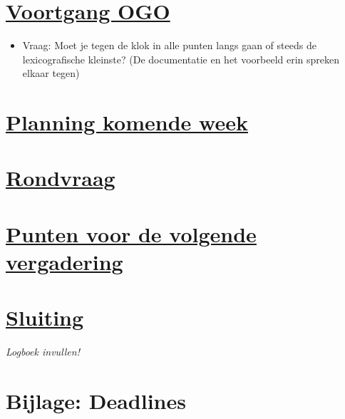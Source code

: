\documentclass[a4paper]{article}
\begin{document}

\section{\underline{Voortgang OGO}} %
\label{sec:voortgang_ogo}
    \begin{itemize}
        \item Vraag: Moet je tegen de klok in alle punten langs gaan of steeds de lexicografische kleinste? (De documentatie en het voorbeeld erin spreken elkaar tegen)
    \end{itemize}

\section{\underline{Planning komende week}} %
\label{sec:planning_komende_week}


\section{\underline{Rondvraag}} %
\label{sec:rondvraag}


\section{\underline{Punten voor de volgende vergadering}} %
\label{sec:punten_voor_de_volgende_vergadering}


\section{\underline{Sluiting}} %
\label{sec:sluiting}
\small{\emph{Logboek invullen!}}

\section{Bijlage: Deadlines} %
\label{sec:bijlage_deadlines}
\end{document}
